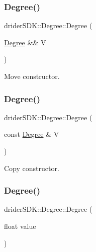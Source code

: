 \subsubsection{\texorpdfstring{Degree()}{Degree()}\hspace{0.1cm}{\footnotesize\ttfamily [2/4]}}
{\footnotesize\ttfamily drider\+S\+D\+K\+::\+Degree\+::\+Degree (\begin{DoxyParamCaption}\item[{\hyperlink{classdrider_s_d_k_1_1_degree}{Degree} \&\&}]{V }\end{DoxyParamCaption})\hspace{0.3cm}{\ttfamily [default]}}

Move constructor. \mbox{\label{classdrider_s_d_k_1_1_degree_a94a3842a811edb51f578d4f6da487e3b}} 
\subsubsection{\texorpdfstring{Degree()}{Degree()}\hspace{0.1cm}{\footnotesize\ttfamily [3/4]}}
{\footnotesize\ttfamily drider\+S\+D\+K\+::\+Degree\+::\+Degree (\begin{DoxyParamCaption}\item[{const \hyperlink{classdrider_s_d_k_1_1_degree}{Degree} \&}]{V }\end{DoxyParamCaption})}

Copy constructor. \mbox{\label{classdrider_s_d_k_1_1_degree_ada0c9ad7f00c36d1209fc1e7794911d7}} 
\subsubsection{\texorpdfstring{Degree()}{Degree()}\hspace{0.1cm}{\footnotesize\ttfamily [4/4]}}
{\footnotesize\ttfamily drider\+S\+D\+K\+::\+Degree\+::\+Degree (\begin{DoxyParamCaption}\item[{float}]{value }\end{DoxyParamCaption})\hspace{0.3cm}{\ttfamily [explicit]}}

